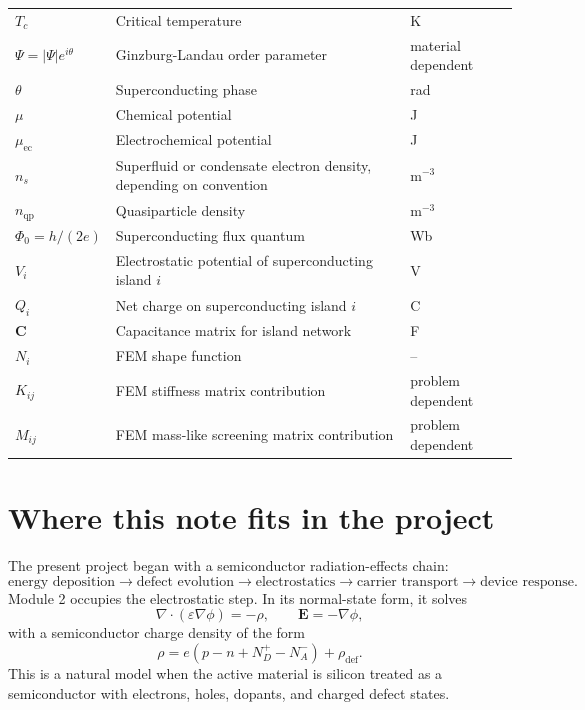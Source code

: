 \documentclass[11pt]{article}
\newcommand{\Evec}{\mathbf{E}}
\newcommand{\rhodef}{\rho_{\mathrm{def}}}
\newcommand{\Psisc}{\Psi}
\newcommand{\thetaSC}{\theta}
\newcommand{\muchem}{\mu}
\newcommand{\muec}{\mu_{\mathrm{ec}}}
\newcommand{\Tc}{T_{c}}
\newcommand{\PhiZero}{\Phi_{0}}
\newcommand{\Cmat}{\mathbf{C}}
\begin{document}
\begin{longtable}{p{} p{} p{}}
$\Tc$ & Critical temperature & K \\
$\Psisc=|\Psisc|e^{i\thetaSC}$ & Ginzburg-Landau order parameter & material dependent \\
$\thetaSC$ & Superconducting phase & rad \\
$\muchem$ & Chemical potential & J \\
$\muec$ & Electrochemical potential & J \\
$n_s$ & Superfluid or condensate electron density, depending on convention & m$^{-3}$ \\
$n_{\mathrm{qp}}$ & Quasiparticle density & m$^{-3}$ \\
$\PhiZero=h/(2e)$ & Superconducting flux quantum & Wb \\
$V_i$ & Electrostatic potential of superconducting island $i$ & V \\
$Q_i$ & Net charge on superconducting island $i$ & C \\
$\Cmat$ & Capacitance matrix for island network & F \\
$N_i$ & FEM shape function & -- \\
$K_{ij}$ & FEM stiffness matrix contribution & problem dependent \\
$M_{ij}$ & FEM mass-like screening matrix contribution & problem dependent \\
\bottomrule
\end{longtable}

\section{Where this note fits in the project}

The present project began with a semiconductor radiation-effects chain:
\begin{equation}
\text{energy deposition}\rightarrow \text{defect evolution}\rightarrow \text{electrostatics}\rightarrow \text{carrier transport}\rightarrow \text{device response}.
\end{equation}
Module 2 occupies the electrostatic step. In its normal-state form, it solves
\begin{equation}
\nabla\cdot\left(\varepsilon\nabla\phi\right)=-\rho,
\qquad
\Evec=-\nabla\phi,
\end{equation}
with a semiconductor charge density of the form
\begin{equation}
\rho = e(p-n+N_D^+-N_A^-)+\rhodef.
\label{eq:semiconductor_charge_recap}
\end{equation}
This is a natural model when the active material is silicon treated as a semiconductor with electrons, holes, dopants, and charged defect states.
\end{document}
